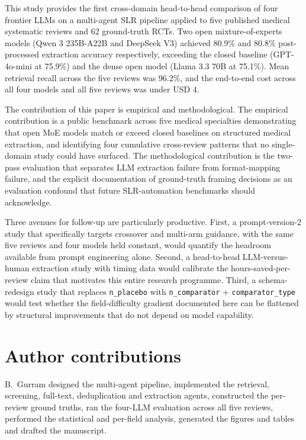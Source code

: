 \documentclass[a4paper,fleqn]{cas-sc}
\begin{document}
This study provides the first cross-domain head-to-head comparison of
four frontier LLMs on a multi-agent SLR pipeline applied to five
published medical systematic reviews and 62 ground-truth RCTs. Two
open mixture-of-experts models (Qwen 3 235B-A22B and DeepSeek V3)
achieved 80.9\% and 80.8\% post-processed extraction accuracy
respectively, exceeding the closed baseline (GPT-4o-mini at 75.9\%) and
the dense open model (Llama 3.3 70B at 75.1\%). Mean retrieval recall
across the five reviews was 96.2\%, and the end-to-end cost across all
four models and all five reviews was under USD 4.

The contribution of this paper is empirical and methodological. The
empirical contribution is a public benchmark across five
medical specialties demonstrating that open MoE models match or exceed
closed baselines on structured medical extraction, and identifying four
cumulative cross-review patterns that no single-domain study could have
surfaced. The methodological contribution is the two-pass evaluation
that separates LLM extraction failure from format-mapping failure, and
the explicit documentation of ground-truth framing decisions as an
evaluation confound that future SLR-automation benchmarks should
acknowledge.

Three avenues for follow-up are particularly productive. First, a
prompt-version-2 study that specifically targets crossover and
multi-arm guidance, with the same five reviews and four models held
constant, would quantify the headroom available from prompt engineering
alone. Second, a head-to-head LLM-versus-human extraction study with
timing data would calibrate the hours-saved-per-review claim that
motivates this entire research programme. Third, a schema-redesign study
that replaces \texttt{n\_placebo} with \texttt{n\_comparator} +
\texttt{comparator\_type} would test whether the field-difficulty
gradient documented here can be flattened by structural improvements
that do not depend on model capability.

\section*{Author contributions}
B.~Gurram designed the multi-agent pipeline, implemented the
retrieval, screening, full-text, deduplication and extraction agents,
constructed the per-review ground truths, ran the four-LLM evaluation
across all five reviews, performed the statistical and per-field
analysis, generated the figures and tables and drafted the manuscript.
\end{document}
